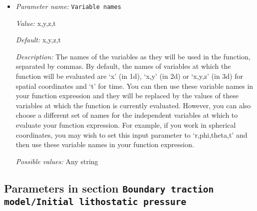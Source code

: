 \begin{itemize}
{\it Default:} 0; 0; 0


{\it Description:} The formula that denotes the function you want to evaluate for particular values of the independent variables. This expression may contain any of the usual operations such as addition or multiplication, as well as all of the common functions such as `sin' or `cos'. In addition, it may contain expressions like `if(x>0, 1, -1)' where the expression evaluates to the second argument if the first argument is true, and to the third argument otherwise. For a full overview of possible expressions accepted see the documentation of the muparser library at http://muparser.beltoforion.de/.

If the function you are describing represents a vector-valued function with multiple components, then separate the expressions for individual components by a semicolon.


{\it Possible values:} Any string
\item {\it Parameter name:} {\tt Variable names}
\label{parameters:Boundary traction model/Function/Variable names}
\label{parameters:Boundary_20traction_20model/Function/Variable_20names}


{\it Value:} x,y,z,t


{\it Default:} x,y,z,t


{\it Description:} The names of the variables as they will be used in the function, separated by commas. By default, the names of variables at which the function will be evaluated are `x' (in 1d), `x,y' (in 2d) or `x,y,z' (in 3d) for spatial coordinates and `t' for time. You can then use these variable names in your function expression and they will be replaced by the values of these variables at which the function is currently evaluated. However, you can also choose a different set of names for the independent variables at which to evaluate your function expression. For example, if you work in spherical coordinates, you may wish to set this input parameter to `r,phi,theta,t' and then use these variable names in your function expression.


{\it Possible values:} Any string
\end{itemize}

\subsection{Parameters in section \tt Boundary traction model/Initial lithostatic pressure}
\label{parameters:Boundary_20traction_20model/Initial_20lithostatic_20pressure}


